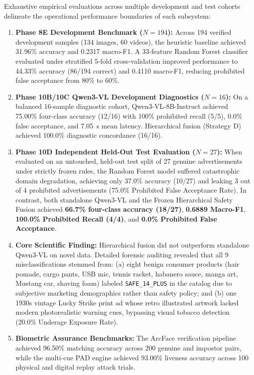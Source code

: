 \documentclass[12pt,a4paper]{report}
\begin{document}
\noindent
Exhaustive empirical evaluations across multiple development and test cohorts delineate the operational performance boundaries of each subsystem:
\begin{enumerate}
    \item \textbf{Phase 8E Development Benchmark ($N=194$):} Across 194 verified development samples (134 images, 60 videos), the heuristic baseline achieved 31.96\% accuracy and 0.2317 macro-F1. A 33-feature Random Forest classifier evaluated under stratified 5-fold cross-validation improved performance to 44.33\% accuracy (86/194 correct) and 0.4110 macro-F1, reducing prohibited false acceptance from 80\% to 60\%.
    \item \textbf{Phase 10B/10C Qwen3-VL Development Diagnostics ($N=16$):} On a balanced 16-sample diagnostic cohort, Qwen3-VL-8B-Instruct achieved 75.00\% four-class accuracy (12/16) with 100\% prohibited recall (5/5), 0.0\% false acceptance, and 7.05~s mean latency. Hierarchical fusion (Strategy D) achieved 100.0\% diagnostic concordance (16/16).
    \item \textbf{Phase 10D Independent Held-Out Test Evaluation ($N=27$):} When evaluated on an untouched, held-out test split of 27 genuine advertisements under strictly frozen rules, the Random Forest model suffered catastrophic domain degradation, achieving only 37.0\% accuracy (10/27) and leaking 3 out of 4 prohibited advertisements (75.0\% Prohibited False Acceptance Rate). In contrast, both standalone Qwen3-VL and the Frozen Hierarchical Safety Fusion achieved \textbf{66.7\% four-class accuracy (18/27)}, \textbf{0.6889 Macro-F1}, \textbf{100.0\% Prohibited Recall (4/4)}, and \textbf{0.0\% Prohibited False Acceptance}.
    \item \textbf{Core Scientific Finding:} Hierarchical fusion did not outperform standalone Qwen3-VL on novel data. Detailed forensic auditing revealed that all 9 misclassifications stemmed from: (a) eight benign consumer products (hair pomade, cargo pants, USB mic, tennis racket, habanero sauce, manga art, Mustang car, shaving foam) labeled \texttt{SAFE\_14\_PLUS} in the catalog due to subjective marketing demographics rather than safety policy; and (b) one 1930s vintage Lucky Strike print ad whose retro illustrated artwork lacked modern photorealistic warning cues, bypassing visual tobacco detection (20.0\% Underage Exposure Rate).
    \item \textbf{Biometric Assurance Benchmarks:} The ArcFace verification pipeline achieved 96.50\% matching accuracy across 200 genuine and impostor pairs, while the multi-cue PAD engine achieved 93.00\% liveness accuracy across 100 physical and digital replay attack trials.
\end{enumerate}
\end{document}
